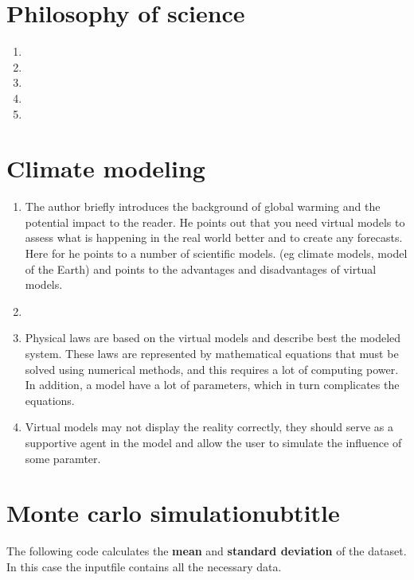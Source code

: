 \section{Philosophy of science} 
\begin{enumerate}
	\item
	\item
	\item
	\item
	\item
\end{enumerate}
\section{Climate modeling}
\begin{enumerate}
  \item The author briefly introduces the background of global warming and the potential impact to the reader.
  		He points out that you need virtual models to assess what is happening in the real world better and to 
  		create any forecasts. Here for he  points to a number of scientific models. (eg climate models, model of the Earth) 
  		and points to the advantages and disadvantages of  virtual models.
  \item 
  \item	Physical laws are based on the virtual models and describe best the modeled system. These laws are represented by mathematical equations that must be solved 
  		using numerical methods, and this requires a lot of computing power. In addition, a model have a lot of parameters, which in turn complicates the equations.
  \item Virtual  models may not display the reality correctly, they should serve as a supportive agent in the model and allow the user to simulate the influence of some paramter.
  
\end{enumerate}

\section{Monte carlo simulationubtitle}
The following code calculates the \textbf{mean}  and \textbf{standard deviation} of the dataset. 
In this case the inputfile contains all the necessary data.

